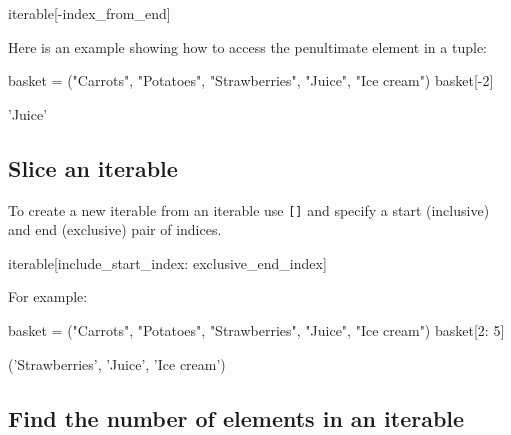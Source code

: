 \begin{pyin}
iterable[-index_from_end]
\end{pyin}



Here is an example showing how to access the penultimate element in a tuple:




\begin{pyin}
basket = ("Carrots", "Potatoes", "Strawberries", "Juice", "Ice cream")
basket[-2]
\end{pyin}





\begin{raw}
'Juice'
\end{raw}





\subsection{Slice an iterable}
\label{sec:slice_an_iterable}

To create a new iterable from an iterable use \texttt{[]} and specify a start
(inclusive) and end (exclusive) pair of indices.


\begin{pyin}
iterable[include_start_index: exclusive_end_index]
\end{pyin}



For example:




\begin{pyin}
basket = ("Carrots", "Potatoes", "Strawberries", "Juice", "Ice cream")
basket[2: 5]
\end{pyin}





\begin{raw}
('Strawberries', 'Juice', 'Ice cream')
\end{raw}





\subsection{Find the number of elements in an iterable}
\label{\detokenize{building-tools/02-functions-and-data-structures/how/main:find-the-number-of-elements-in-an-iterable}}\label{\detokenize{building-tools/02-functions-and-data-structures/how/main:id3}}

